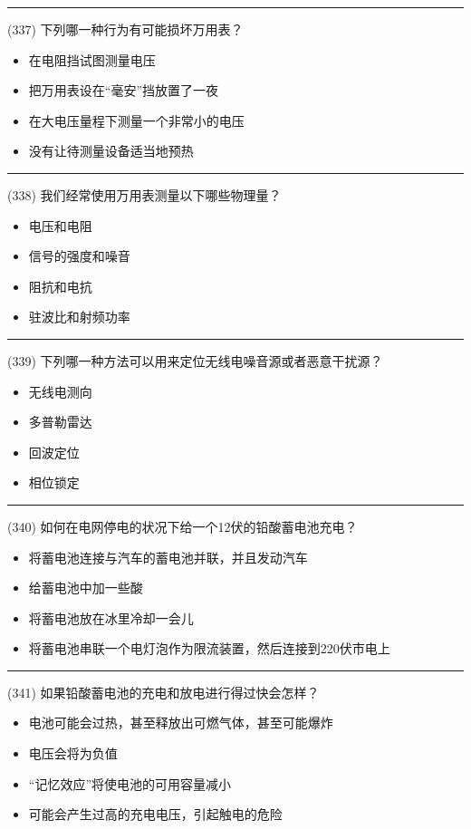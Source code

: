 \documentclass[twocolumn]{ctexart}  %
\begin{document}
\noindent\rule{0.5\textwidth}{1pt}
\heiti (337) 下列哪一种行为有可能损坏万用表？ \songti {\color{gray} [LK1195] }
\begin{itemize}
	\item  在电阻挡试图测量电压
	\item  把万用表设在“毫安”挡放置了一夜
	\item  在大电压量程下测量一个非常小的电压
	\item  没有让待测量设备适当地预热
\end{itemize}


\noindent\rule{0.5\textwidth}{1pt}
\heiti (338) 我们经常使用万用表测量以下哪些物理量？ \songti {\color{gray} [LK1196] }
\begin{itemize}
	\item  电压和电阻
	\item  信号的强度和噪音
	\item  阻抗和电抗
	\item  驻波比和射频功率
\end{itemize}


\noindent\rule{0.5\textwidth}{1pt}
\heiti (339) 下列哪一种方法可以用来定位无线电噪音源或者恶意干扰源？ \songti {\color{gray} [LK1206] }
\begin{itemize}
	\item  无线电测向
	\item  多普勒雷达
	\item  回波定位
	\item  相位锁定
\end{itemize}


\noindent\rule{0.5\textwidth}{1pt}
\heiti (340) 如何在电网停电的状况下给一个12伏的铅酸蓄电池充电？ \songti {\color{gray} [LK1229] }
\begin{itemize}
	\item  将蓄电池连接与汽车的蓄电池并联，并且发动汽车
	\item  给蓄电池中加一些酸
	\item  将蓄电池放在冰里冷却一会儿
	\item  将蓄电池串联一个电灯泡作为限流装置，然后连接到220伏市电上
\end{itemize}


\noindent\rule{0.5\textwidth}{1pt}
\heiti (341) 如果铅酸蓄电池的充电和放电进行得过快会怎样？ \songti {\color{gray} [LK1231] }
\begin{itemize}
	\item  电池可能会过热，甚至释放出可燃气体，甚至可能爆炸
	\item  电压会将为负值
	\item  “记忆效应”将使电池的可用容量减小
	\item  可能会产生过高的充电电压，引起触电的危险
\end{itemize}
\end{document}
